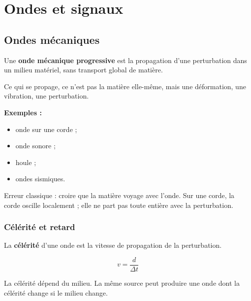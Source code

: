 \documentclass[11pt,a4paper]{article}
\begin{document}
\newpage

\section{Ondes et signaux}

\subsection{Ondes mécaniques}

\begin{definitionbox}
Une \textbf{onde mécanique progressive} est la propagation d'une perturbation dans un milieu matériel, sans transport global de matière.
\end{definitionbox}

\begin{sensbox}
Ce qui se propage, ce n'est pas la matière elle-même, mais une déformation, une vibration, une perturbation.
\end{sensbox}

\textbf{Exemples :}
\begin{itemize}
    \item onde sur une corde ;
    \item onde sonore ;
    \item houle ;
    \item ondes sismiques.
\end{itemize}

\begin{attentionbox}
Erreur classique : croire que la matière voyage avec l'onde.  
Sur une corde, la corde oscille localement ; elle ne part pas toute entière avec la perturbation.
\end{attentionbox}

\subsubsection{Célérité et retard}

\begin{definitionbox}
La \textbf{célérité} d'une onde est la vitesse de propagation de la perturbation.
\end{definitionbox}

\begin{proprbox}
\[
v=\frac{d}{\Delta t}
\]
\end{proprbox}

\begin{sensbox}
La célérité dépend du milieu.  
La même source peut produire une onde dont la célérité change si le milieu change.
\end{sensbox}
\end{document}
